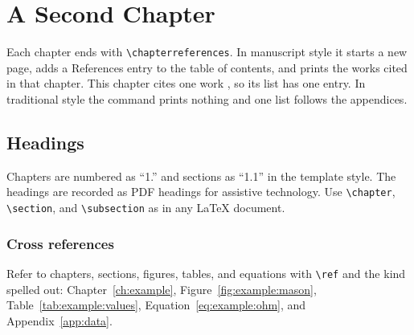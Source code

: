 \chapter{A Second Chapter}
\label{ch:second}

Each chapter ends with \verb|\chapterreferences|. In manuscript style it starts a new page, adds a References entry to the table of contents, and prints the works cited in that chapter. This chapter cites one work \cite{bor_revisiting_2026}, so its list has one entry. In traditional style the command prints nothing and one list follows the appendices.

\section{Headings}
\label{sec:second:headings}

Chapters are numbered as ``1.'' and sections as ``1.1'' in the template style. The headings are recorded as PDF headings for assistive technology. Use \verb|\chapter|, \verb|\section|, and \verb|\subsection| as in any LaTeX document.

\subsection{Cross references}
\label{sec:second:refs}

Refer to chapters, sections, figures, tables, and equations with \verb|\ref| and the kind spelled out: Chapter~\ref{ch:example}, Figure~\ref{fig:example:mason}, Table~\ref{tab:example:values}, Equation~\ref{eq:example:ohm}, and Appendix~\ref{app:data}.

\chapterreferences
